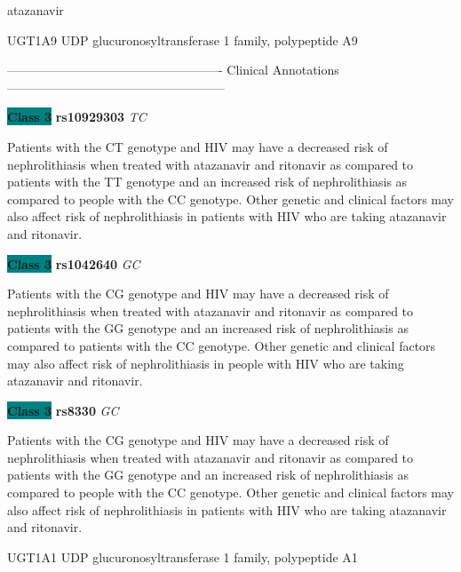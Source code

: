 \documentclass{resume} %
\begin{document}
\begin{rSection}{ atazanavir }
\begin{rSubsection}{ UGT1A9 }{ UDP glucuronosyltransferase 1 family, polypeptide A9 }{}{}
\item[] ---------------------------------------------------- Clinical Annotations -----------------------------------------------------\newline
\item \textbf{\colorbox{teal} {Class 3}} \textbf{ rs10929303 } \textit{ TC }
\item[] Patients with the CT genotype and HIV may have a decreased risk of nephrolithiasis when treated with atazanavir and ritonavir as compared to patients with the TT genotype and an increased risk of nephrolithiasis as compared to people with the CC genotype. Other genetic and clinical factors may also affect risk of nephrolithiasis in patients with HIV who are taking atazanavir and ritonavir. \item \textbf{\colorbox{teal} {Class 3}} \textbf{ rs1042640 } \textit{ GC }
\item[] Patients with the CG genotype and HIV may have a decreased risk of nephrolithiasis when treated with atazanavir and ritonavir as compared to patients with the GG genotype and an increased risk of nephrolithiasis as compared to patients with the CC genotype. Other genetic and clinical factors may also affect risk of nephrolithiasis in people with HIV who are taking atazanavir and ritonavir.\item \textbf{\colorbox{teal} {Class 3}} \textbf{ rs8330 } \textit{ GC }
\item[] Patients with the CG genotype and HIV may have a decreased risk of nephrolithiasis when treated with atazanavir and ritonavir as compared to patients with the GG genotype and an increased risk of nephrolithiasis as compared to people with the CC genotype. Other genetic and clinical factors may also affect risk of nephrolithiasis in patients with HIV who are taking atazanavir and ritonavir.
\end{rSubsection}\begin{rSubsection}{ UGT1A1 }{ UDP glucuronosyltransferase 1 family, polypeptide A1 }{}{}
\item[]


\end{rSubsection}
\end{rSection}
\end{document}
